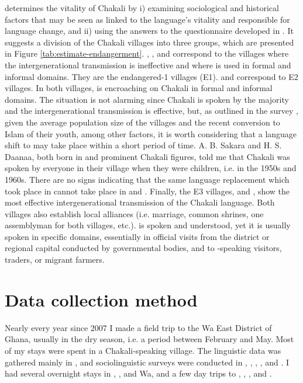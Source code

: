 \citet{brin15c} determines the vitality of  Chakali by i) examining sociological and historical factors that may be seen as linked to the language’s vitality and responsible for language change, and ii) using the answers to the questionnaire developed in \citet{Reco03}. It suggests a division of the Chakali villages into three groups, which are presented in Figure \ref{tab:estimate-endangerment}. , ,  and  correspond to the villages where the intergenerational transmission is ineffective and where  is used in formal and informal domains. They are the endangered-1  villages (E1).   and  correspond to E2 villages. In both villages,   is encroaching on  Chakali in formal and informal domains. The situation is not alarming since Chakali is spoken by the majority and  the intergenerational transmission is effective, but, as outlined in the survey \citep[Section 2.2.2 in ][]{brin15c},  given the average population size of the villages and the recent conversion to Islam of their youth, among other factors, it is worth considering that a language shift to  may take place within a short period of time.  A. B. Sakara and H. S. Daanaa, both born in  and prominent Chakali figures, told me that Chakali was spoken by everyone in their village when they were children, i.e. in the 1950s and 1960s. There  are no signs indicating that the same language replacement which took place in   cannot take place in  and . Finally, the E3 villages,  and , show the most effective intergenerational transmission of the Chakali language. Both villages also establish local alliances (i.e. marriage, common shrines, one assemblyman for both villages, etc.).  is spoken and understood, yet it is usually spoken in specific  domains, essentially  in official visits from the district or regional capital conducted by governmental bodies,  and  to  -speaking visitors, traders,  or migrant farmers.


\section{Data collection method}
\label{sec:method}

Nearly every year since 2007 I  made a field trip to the Wa East District of Ghana, usually in the dry season, i.e.  a  period between February and  May.  Most of my stays were spent in a Chakali-speaking village. The linguistic data was gathered mainly in , and sociolinguistic surveys were conducted in , , , , and .  I had several overnight stays in , ,  and Wa, and a few day trips to , , , and . 

